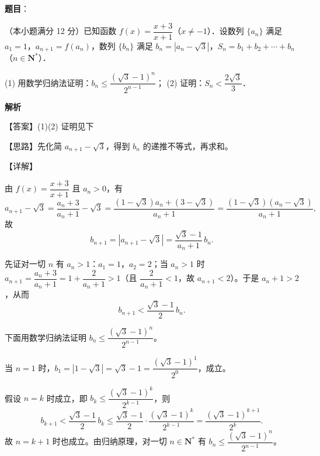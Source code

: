 \begin{answer}


\end{answer}
\begin{answer}

\textbf{题目}：

（本小题满分 12 分）已知函数 $f(x) = \dfrac{x+3}{x+1}$（$x \neq -1$）．设数列 $\{a_n\}$ 满足 $a_1 = 1$，$a_{n+1} = f(a_n)$，数列 $\{b_n\}$ 满足 $b_n = |a_n - \sqrt{3}|$，$S_n = b_1 + b_2 + \cdots + b_n$（$n \in \mathbf{N}^*$）．

(1) 用数学归纳法证明：$b_n \leqslant \dfrac{(\sqrt{3}-1)^n}{2^{n-1}}$；
(2) 证明：$S_n < \dfrac{2\sqrt{3}}{3}$．

\textbf{解析}

【答案】(1)(2) 证明见下

【思路】先化简 $a_{n+1} - \sqrt{3}$，得到 $b_n$ 的递推不等式，再求和。

【详解】


由 $f(x) = \dfrac{x+3}{x+1}$ 且 $a_n > 0$，有
\nopagebreak[4]
\[
a_{n+1} - \sqrt{3} = \frac{a_n + 3}{a_n + 1} - \sqrt{3} = \frac{(1-\sqrt{3})a_n + (3-\sqrt{3})}{a_n+1} = \frac{(1-\sqrt{3})(a_n - \sqrt{3})}{a_n+1},
\]
故
\nopagebreak[4]
\[
b_{n+1} = \left|a_{n+1} - \sqrt{3}\right| = \frac{\sqrt{3}-1}{a_n+1}\,b_n.
\]

先证对一切 $n$ 有 $a_n > 1$：$a_1 = 1$，$a_2 = 2$；当 $a_n > 1$ 时 $a_{n+1} = \dfrac{a_n+3}{a_n+1} = 1 + \dfrac{2}{a_n+1} > 1$（且 $\dfrac{2}{a_n+1} < 1$，故 $a_{n+1} < 2$）。于是 $a_n + 1 > 2$，从而
\nopagebreak[4]
\[
b_{n+1} < \frac{\sqrt{3}-1}{2}\,b_n.
\]

下面用数学归纳法证明 $b_n \leqslant \dfrac{(\sqrt{3}-1)^n}{2^{n-1}}$。

当 $n = 1$ 时，$b_1 = |1-\sqrt{3}| = \sqrt{3}-1 = \dfrac{(\sqrt{3}-1)^1}{2^{0}}$，成立。

假设 $n = k$ 时成立，即 $b_k \leqslant \dfrac{(\sqrt{3}-1)^k}{2^{k-1}}$，则
\nopagebreak[4]
\[
b_{k+1} < \frac{\sqrt{3}-1}{2}\,b_k \leqslant \frac{\sqrt{3}-1}{2}\cdot\frac{(\sqrt{3}-1)^k}{2^{k-1}} = \frac{(\sqrt{3}-1)^{k+1}}{2^{k}}.
\]
故 $n = k+1$ 时也成立。由归纳原理，对一切 $n \in \mathbf{N}^*$ 有 $b_n \leqslant \dfrac{(\sqrt{3}-1)^n}{2^{n-1}}$。


\end{answer}
